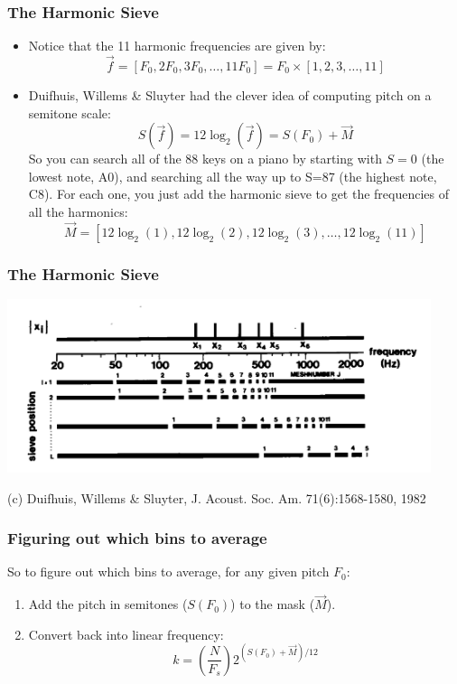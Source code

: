 \documentclass{beamer}
\begin{document}
\begin{frame}
  \frametitle{The Harmonic Sieve}

  \begin{itemize}
    \item Notice that the 11 harmonic frequencies are given by:
      \[
      \vec{f}=\left[F_0, 2F_0, 3F_0, \ldots, 11 F_0\right] = F_0 \times\left[1,2,3,\ldots,11\right]
      \] 
    \item Duifhuis, Willems \& Sluyter had the clever idea of
      computing pitch on a semitone scale:
      \[
      S(\vec{f}) = 12\log_2(\vec{f}) = S(F_0) + \vec{M}
      \]
      So you can search all of the 88 keys on a piano by starting with $S=0$ (the lowest note, A0), and
      searching all the way up to S=87 (the highest note, C8).  For each one, you just add
      the harmonic sieve to get the frequencies of all the harmonics:
      \[
      \vec{M} = \left[12\log_2(1), 12\log_2(2), 12\log_2(3),\ldots,12\log_2(11)\right]
      \]
  \end{itemize}
\end{frame}

\begin{frame}
  \frametitle{The Harmonic Sieve}

  \centerline{\includegraphics[height=2in]{duifhuis7.png}}
  \begin{tiny}
    (c) Duifhuis, Willems \& Sluyter, J. Acoust. Soc. Am. 71(6):1568-1580, 1982
  \end{tiny}
\end{frame}

\begin{frame}
  \frametitle{Figuring out which bins to average}

  So to figure out which bins to average, for any given pitch $F_0$:
  \begin{enumerate}
  \item Add the pitch in semitones ($S(F_0)$) to the mask ($\vec{M}$).
  \item Convert back into linear frequency:
    \[
    k = \left(\frac{N}{F_s}\right) 2^{(S(F_0)+\vec{M})/12}
    \]
  \end{enumerate}
\end{frame}
    
\end{document}
